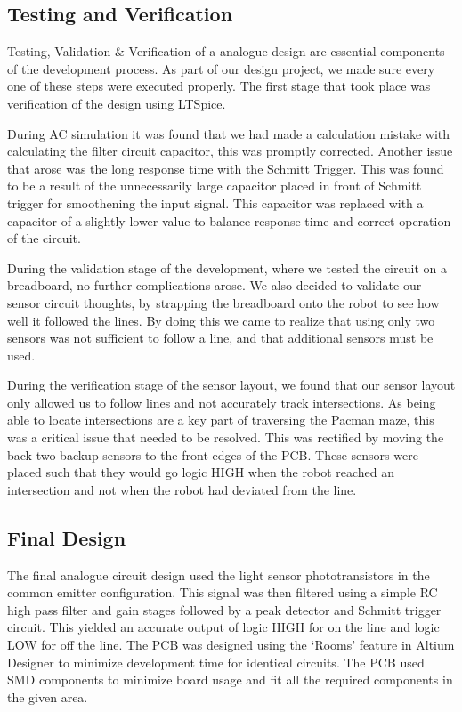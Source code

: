 \documentclass{article}
\begin{document}
\subsection{Testing and Verification}

Testing, Validation \& Verification of a analogue design are essential components of the development process. As part of our design project, we made sure every one of these steps were executed properly. The first stage that took place was verification of the design using LTSpice.

During AC simulation it was found that we had made a calculation mistake with calculating the filter circuit capacitor, this was promptly corrected. Another issue that arose was the long response time with the Schmitt Trigger. This was found to be a result of the unnecessarily large capacitor placed in front of Schmitt trigger for smoothening the input signal. This capacitor was replaced with a capacitor of a slightly lower value to balance response time and correct operation of the circuit.

During the validation stage of the development, where we tested the circuit on a breadboard, no further complications arose. We also decided to validate our sensor circuit thoughts, by strapping the breadboard onto the robot to see how well it followed the lines. By doing this we came to realize that using only two sensors was not sufficient to follow a line, and that additional sensors must be used. 

During the verification stage of the sensor layout, we found that our sensor layout only allowed us to follow lines and not accurately track intersections. As being able to locate intersections are a key part of traversing the Pacman maze, this was a critical issue that needed to be resolved. This was rectified by moving the back two backup sensors to the front edges of the PCB. These sensors were placed such that they would go logic HIGH when the robot reached an intersection and not when the robot had deviated from the line.

\subsection{Final Design}

The final analogue circuit design used the light sensor phototransistors in the common emitter configuration. This signal was then filtered using a simple RC high pass filter and gain stages followed by a peak detector and Schmitt trigger circuit. This yielded an accurate output of logic HIGH for on the line and logic LOW for off the line. The PCB was designed using the `Rooms' feature in Altium Designer to minimize development time for identical circuits. The PCB used SMD components to minimize board usage and fit all the required components in the given area.
\end{document}

